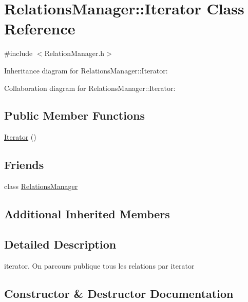 \hypertarget{classRelationsManager_1_1Iterator}{}\section{Relations\+Manager\+:\+:Iterator Class Reference}
\label{classRelationsManager_1_1Iterator}


{\ttfamily \#include $<$Relation\+Manager.\+h$>$}



Inheritance diagram for Relations\+Manager\+:\+:Iterator\+:


Collaboration diagram for Relations\+Manager\+:\+:Iterator\+:
\subsection*{Public Member Functions}
\begin{DoxyCompactItemize}
\item 
\hyperlink{classRelationsManager_1_1Iterator_a15c19954a2b3300f1e7a8678bc31e0d6}{Iterator} ()
\end{DoxyCompactItemize}
\subsection*{Friends}
\begin{DoxyCompactItemize}
\item 
class \hyperlink{classRelationsManager_1_1Iterator_ac617894445bd4f12c905741b1b4f9f6a}{Relations\+Manager}
\end{DoxyCompactItemize}
\subsection*{Additional Inherited Members}


\subsection{Detailed Description}
iterator. On parcours publique tous les relations par iterator 

\subsection{Constructor \& Destructor Documentation}
